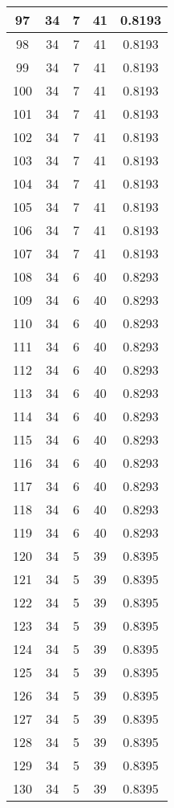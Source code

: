 \documentclass[letterpaper, 12pt]{article}
\begin{document}
\begin{longtable}{|c|c|c|c|c|}
\hline
97 & 34 & 7 & 41 & 0.8193 \\
\hline
98 & 34 & 7 & 41 & 0.8193 \\
\hline
99 & 34 & 7 & 41 & 0.8193 \\
\hline
100 & 34 & 7 & 41 & 0.8193 \\
\hline
101 & 34 & 7 & 41 & 0.8193 \\
\hline
102 & 34 & 7 & 41 & 0.8193 \\
\hline
103 & 34 & 7 & 41 & 0.8193 \\
\hline
104 & 34 & 7 & 41 & 0.8193 \\
\hline
105 & 34 & 7 & 41 & 0.8193 \\
\hline
106 & 34 & 7 & 41 & 0.8193 \\
\hline
107 & 34 & 7 & 41 & 0.8193 \\
\hline
108 & 34 & 6 & 40 & 0.8293 \\
\hline
109 & 34 & 6 & 40 & 0.8293 \\
\hline
110 & 34 & 6 & 40 & 0.8293 \\
\hline
111 & 34 & 6 & 40 & 0.8293 \\
\hline
112 & 34 & 6 & 40 & 0.8293 \\
\hline
113 & 34 & 6 & 40 & 0.8293 \\
\hline
114 & 34 & 6 & 40 & 0.8293 \\
\hline
115 & 34 & 6 & 40 & 0.8293 \\
\hline
116 & 34 & 6 & 40 & 0.8293 \\
\hline
117 & 34 & 6 & 40 & 0.8293 \\
\hline
118 & 34 & 6 & 40 & 0.8293 \\
\hline
119 & 34 & 6 & 40 & 0.8293 \\
\hline
120 & 34 & 5 & 39 & 0.8395 \\
\hline
121 & 34 & 5 & 39 & 0.8395 \\
\hline
122 & 34 & 5 & 39 & 0.8395 \\
\hline
123 & 34 & 5 & 39 & 0.8395 \\
\hline
124 & 34 & 5 & 39 & 0.8395 \\
\hline
125 & 34 & 5 & 39 & 0.8395 \\
\hline
126 & 34 & 5 & 39 & 0.8395 \\
\hline
127 & 34 & 5 & 39 & 0.8395 \\
\hline
128 & 34 & 5 & 39 & 0.8395 \\
\hline
129 & 34 & 5 & 39 & 0.8395 \\
\hline
130 & 34 & 5 & 39 & 0.8395 \\

\end{longtable}
\end{document}
